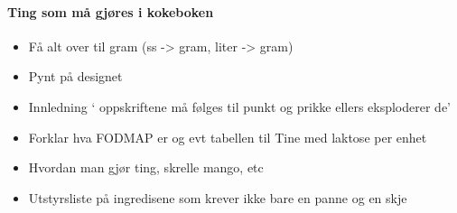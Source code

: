 
\paragraph{Ting som må gjøres i kokeboken}
\begin{itemize}[noitemsep]

  \item Få alt over til gram (ss -> gram, liter -> gram)
  \item Pynt på designet
  \item Innledning ` oppskriftene må følges til punkt og prikke ellers eksploderer de'
  \item Forklar hva FODMAP er og evt tabellen til Tine med laktose per enhet
  \item Hvordan man gjør ting, skrelle mango, etc
  \item Utstyrsliste på ingredisene som krever ikke bare en panne og en skje
\end{itemize}

